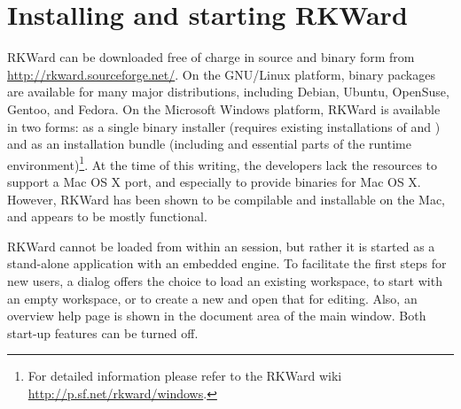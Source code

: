 \section{Installing and starting RKWard}
\label{sec:installing_starting_RKWard}
RKWard can be downloaded free of charge in source and binary form from \url{http://rkward.sourceforge.net/}. 
On the GNU/Linux platform, binary packages are available for many major distributions,
including Debian, Ubuntu, OpenSuse, Gentoo, and Fedora. On the Microsoft Windows
platform, RKWard is available in two forms: as a single binary
installer (requires existing installations of
 and ) and
as an installation bundle (including  and
essential parts of the  runtime environment)\footnote{For detailed information please refer to the 
RKWard wiki \url{http://p.sf.net/rkward/windows}.}. At the time of
this writing, the developers lack the resources to support a Mac OS X
port, and especially to provide binaries for Mac OS X. However, RKWard
has been shown to be compilable and installable on the Mac, and appears
to be mostly functional.

RKWard cannot be loaded from within an 
session, but rather it is started as a stand-alone application with an
embedded  engine. To facilitate the first
steps for new users, a dialog offers the choice to load an existing
workspace, to start with an empty workspace, or to create a new
 and open that for editing. Also, an overview help page is
shown in the document area of the main window. Both start-up features
can be turned off.

